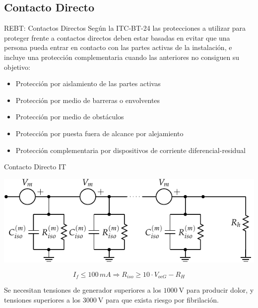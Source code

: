 \documentclass[xcolor={usenames,svgnames,dvipsnames}]{beamer}
\begin{document}
\subsection{Contacto Directo}
\label{sec:orgddb2420}

\begin{frame}[label={sec:org3cda756}]{REBT: Contactos Directos}
Según la ITC-BT-24 las protecciones a utilizar para proteger frente a
contactos directos deben estar \alert{basadas en evitar que una persona pueda
entrar en contacto con las partes activas} de la instalación, e incluye
una protección complementaria cuando las anteriores no consiguen su
objetivo:

\begin{itemize}
\item Protección por \alert{aislamiento de las partes activas}

\item Protección por medio de \alert{barreras o envolventes}

\item Protección por medio de \alert{obstáculos}

\item Protección por puesta \alert{fuera de alcance} por alejamiento

\item Protección complementaria por \alert{dispositivos de corriente
diferencial}-residual
\end{itemize}
\end{frame}


\begin{frame}[label={sec:org679783f}]{Contacto Directo IT}
\begin{center}
\includegraphics[width=.9\linewidth]{../figs/ContactoDirectoIT_Capacidad.pdf}
\end{center}

$$I_{f}\leq100\, mA\Longrightarrow R_{iso}\geq10\cdot V_{ocG}-R_{H}$$

Se necesitan tensiones de generador superiores a los \(\SI{1000}{\volt}\)
para producir dolor, y tensiones superiores a los \(\SI{3000}{\volt}\)
para que exista riesgo por fibrilación.
\end{frame}
\end{document}
